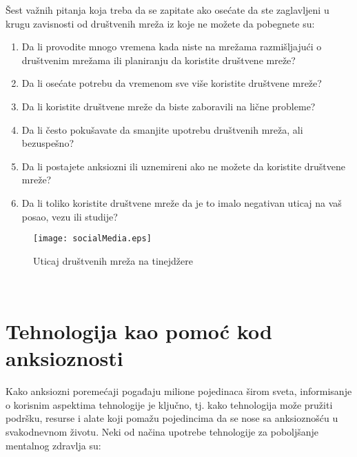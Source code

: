\documentclass[a4paper]{article}
\begin{document}
            Šest važnih pitanja koja treba da se zapitate ako osećate da ste zaglavljeni u krugu zavisnosti od društvenih mreža iz koje ne možete da pobegnete su:
    		\begin{enumerate}
			\item
			Da li provodite mnogo vremena kada niste na mrežama razmišljajući o društvenim mrežama ili planiranju da koristite društvene mreže?
			\item
			Da li osećate potrebu da vremenom sve više koristite društvene mreže?
			\item
			Da li koristite društvene mreže da biste zaboravili na lične probleme?
			\item
			Da li često pokušavate da smanjite upotrebu društvenih mreža, ali bezuspešno?

			\item
			Da li postajete anksiozni ili uznemireni ako ne možete da koristite društvene mreže?
			\item
			Da li toliko koristite društvene mreže da je to imalo negativan uticaj na vaš posao, vezu ili studije?
			
		\end{enumerate}

            \begin{figure}[h]
            \caption{ Uticaj društvenih mreža na tinejdžere \cite{peta}}
            \centering
            \texttt{[image: socialMedia.eps]}
            \end{figure}
            \\
		
		\section{Tehnologija kao pomoć kod anksioznosti}	
		\label{sec:termini_i_citiranje}
            Kako anksiozni poremećaji pogađaju milione pojedinaca širom sveta, informisanje o korisnim aspektima tehnologije je ključno, tj. kako tehnologija može pružiti podršku, resurse i alate koji pomažu pojedincima da se nose sa anksioznošću u svakodnevnom životu. Neki od načina upotrebe tehnologije za poboljšanje mentalnog zdravlja su:
\end{document}
